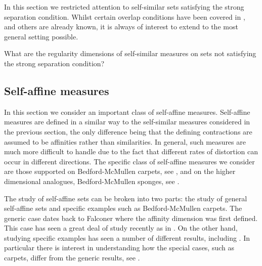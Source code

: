 In this section we restricted attention to self-similar sets satisfying the strong separation condition. Whilst certain overlap conditions have been covered in \cite{hare-hare-tros}, and others are already known, it is always of interest to extend to the most general setting possible.
\begin{question}
What are the regularity dimensions of self-similar measures on sets not satisfying the strong separation condition?
\end{question}





\subsection{Self-affine measures}\label{ch-upper-reg:sec:self-affineresults}


In this section we consider an important class of self-affine measures.  Self-affine measures are defined in a similar way to the self-similar measures considered in the previous section, the only difference being that the defining contractions are assumed to be affinities rather than similarities.  In general, such measures are much more difficult to handle due to the fact that different rates of distortion can occur in different directions.  The specific class of self-affine measures we consider are those supported on Bedford-McMullen carpets, see \cite{bedford, mcmullen}, and on the higher dimensional analogues, Bedford-McMullen sponges, see \cite{kenyonperes, sponges}. 

The study of self-affine sets can be broken into two parts: the study of general self-affine sets and specific examples such as Bedford-McMullen carpets. The generic case dates back to Falconer \cite{falconer-affine} where the affinity dimension was first defined. This case has seen a great deal of study recently as in \cite{barany-hochman-rapaport,hochman-rapaport}. On the other hand, studying specific examples has seen a number of different results, including \cite{bedford,mcmullen, lalley-gatzouras, baranski, mackay, Fr}. In particular there is interest in understanding how the special cases, such as carpets, differ from the generic results, see \cite{jurga-morris, morris-sert}. 

